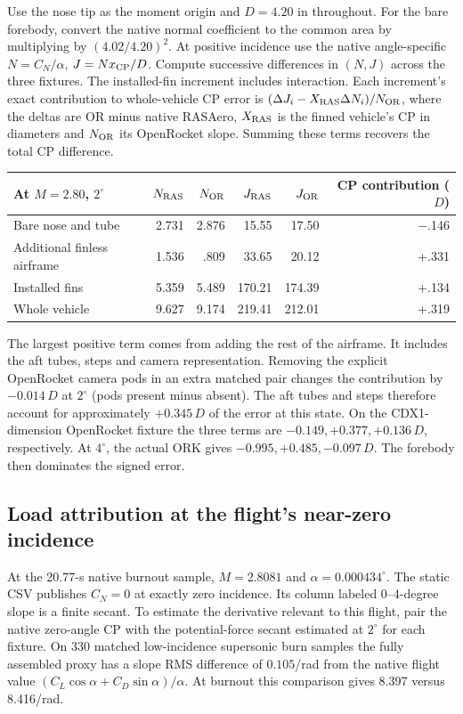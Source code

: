 Use the nose tip as the moment origin and $D=4.20$ in throughout. For the bare forebody, convert the native normal coefficient to the common area by multiplying by $(4.02/4.20)^2$. At positive incidence use the native angle-specific $N=C_N/\alpha$, $J=N x_{\rm CP}/D$. Compute successive differences in $(N,J)$ across the three fixtures. The installed-fin increment includes interaction. Each increment's exact contribution to whole-vehicle CP error is $(\Delta J_i-X_{\rm RAS}\Delta N_i)/N_{\rm OR}$, where the deltas are OR minus native RASAero, $X_{\rm RAS}$ is the finned vehicle's CP in diameters and $N_{\rm OR}$ its OpenRocket slope. Summing these terms recovers the total CP difference.

\begin{center}\small\begin{tabular}{lrrrrr}\toprule
At $M=2.80$, $2^\circ$ & $N_{\rm RAS}$ & $N_{\rm OR}$ & $J_{\rm RAS}$ & $J_{\rm OR}$ & CP contribution ($D$)\\\midrule
Bare nose and tube &2.731&2.876&15.55&17.50&$-$.146\\
Additional finless airframe &1.536&.809&33.65&20.12&+.331\\
Installed fins &5.359&5.489&170.21&174.39&+.134\\\midrule
Whole vehicle &9.627&9.174&219.41&212.01&+.319\\\bottomrule\end{tabular}\end{center}
The largest positive term comes from adding the rest of the airframe. It includes the aft tubes, steps and camera representation. Removing the explicit OpenRocket camera pods in an extra matched pair changes the contribution by $-0.014\,D$ at $2^\circ$ (pods present minus absent). The aft tubes and steps therefore account for approximately $+0.345\,D$ of the error at this state. On the CDX1-dimension OpenRocket fixture the three terms are $-0.149,+0.377,+0.136\,D$, respectively. At $4^\circ$, the actual ORK gives $-0.995,+0.485,-0.097\,D$. The forebody then dominates the signed error.

\clearpage
\subsection*{Load attribution at the flight's near-zero incidence}
At the 20.77-s native burnout sample, $M=2.8081$ and $\alpha=0.000434^\circ$. The static CSV publishes $C_N=0$ at exactly zero incidence. Its column labeled 0--4-degree slope is a finite secant. To estimate the derivative relevant to this flight, pair the native zero-angle CP with the potential-force secant estimated at $2^\circ$ for each fixture. On 330 matched low-incidence supersonic burn samples the fully assembled proxy has a slope RMS difference of $0.105$/rad from the native flight value $(C_L\cos\alpha+C_D\sin\alpha)/\alpha$. At burnout this comparison gives 8.397 versus 8.416/rad.

